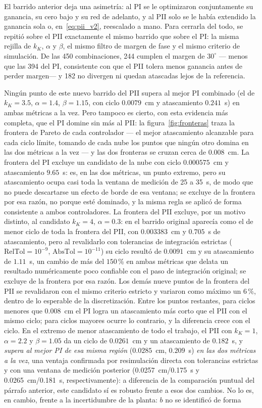 El barrido anterior deja una asimetría: al PI se le optimizaron conjuntamente su ganancia, su cero bajo y su red de adelanto, y al PII solo se le había extendido la ganancia sola o, en~\eqref{eq:pii_v2}, reescalado a mano. Para cerrarla del todo, se repitió sobre el PII exactamente el mismo barrido que sobre el PI: la misma rejilla de $k_K$, $\alpha$ y $\beta$, el mismo filtro de margen de fase y el mismo criterio de simulación. De las 450 combinaciones, 244 cumplen el margen de $30^\circ$ --- menos que las 394 del PI, consistente con que el PII tolera menos ganancia antes de perder margen--- y 182 no divergen ni quedan atascadas lejos de la referencia.

Ningún punto de este nuevo barrido del PII supera al mejor PI combinado (el de~$k_K=3.5$, $\alpha=1.4$, $\beta=1.15$, con ciclo $0.0079$~cm y atascamiento $0.241$~s) en ambas métricas a la vez. Pero tampoco es cierto, con esta evidencia más completa, que el PI domine sin más al PII: la figura~\ref{fig:fronteras} traza la frontera de Pareto de cada controlador --- el mejor atascamiento alcanzable para cada ciclo límite, tomando de cada nube los puntos que ningún otro domina en las dos métricas a la vez --- y las dos fronteras se cruzan cerca de $0.008$~cm. La frontera del PI excluye un candidato de la nube con ciclo $0.000575$~cm y atascamiento $9.65$~s: es, en las dos métricas, un punto extremo, pero su atascamiento ocupa casi toda la ventana de medición de 25 a 35~s, de modo que no puede descartarse un efecto de borde de esa ventana; se excluye de la frontera por esa razón, no porque esté dominado, y la misma regla se aplicó de forma consistente a ambos controladores. La frontera del PII excluye, por un motivo distinto, al candidato $k_K=4$, $\alpha=0.3$: en el barrido original aparecía como el de menor ciclo de toda la frontera del PII, con $0.003383$~cm y $0.705$~s de atascamiento, pero al revalidarlo con tolerancias de integración estrictas ($\mathrm{RelTol}=10^{-9}$, $\mathrm{AbsTol}=10^{-11}$) su ciclo resultó de $0.0091$~cm y su atascamiento de $1.11$~s, un cambio de más del $150$\,\% en ambas métricas que delata un resultado numéricamente poco confiable con el paso de integración original; se excluye de la frontera por esa razón. Los demás nueve puntos de la frontera del PII se revalidaron con el mismo criterio estricto y variaron como máximo un $6$\,\%, dentro de lo esperable de la discretización. Entre los puntos restantes, para ciclos menores que $0.008$~cm el PI logra un atascamiento más corto que el PII con el mismo ciclo; para ciclos mayores ocurre lo contrario, y la diferencia crece con el ciclo. En el extremo de menor atascamiento de todo el trabajo, el PII con $k_K=1$, $\alpha=2.2$ y $\beta=1.05$ da un ciclo de $0.0261$~cm y un atascamiento de $0.182$~s, y \emph{supera al mejor PI de esa misma región} ($0.0285$~cm, $0.209$~s) \emph{en las dos métricas a la vez}, una ventaja confirmada por resimulación directa con tolerancias estrictas y con una ventana de medición posterior (0.0257~cm/0.175~s y 0.0265~cm/0.181~s, respectivamente): a diferencia de la comparación puntual del párrafo anterior, este candidato sí es robusto frente a esos dos cambios. No lo es, en cambio, frente a la incertidumbre de la planta: $b$ no se identificó de forma 